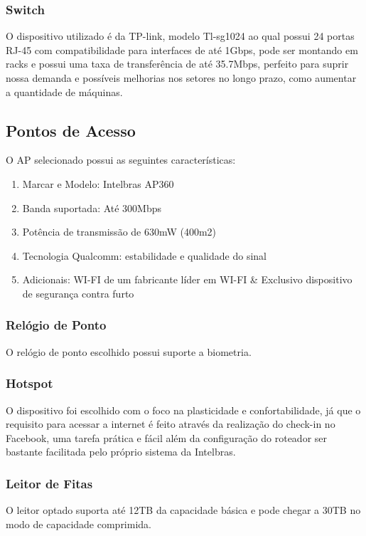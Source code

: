 \documentclass[12pt]{article}
\begin{document}
\subsubsection{Switch}
O dispositivo utilizado é da TP-link, modelo Tl-sg1024 ao qual possui 24 portas RJ-45 com compatibilidade para interfaces de até 1Gbps, pode ser montando em racks e possui uma taxa de transferência de até 35.7Mbps, perfeito para suprir nossa demanda e possíveis melhorias nos setores no longo prazo, como aumentar a quantidade de máquinas.

\subsection{Pontos de Acesso}
O AP selecionado possui as seguintes características:

\begin{enumerate}
    \item Marcar e Modelo: Intelbras AP360
    \item Banda suportada: Até 300Mbps
    \item Potência de transmissão de 630mW (400m2)
    \item Tecnologia Qualcomm: estabilidade e qualidade do sinal
    \item Adicionais: WI-FI de um fabricante líder em WI-FI \& Exclusivo dispositivo de segurança contra furto
\end{enumerate}

\subsubsection{Relógio de Ponto}
O relógio de ponto escolhido possui suporte a biometria.

\subsubsection{Hotspot}
O dispositivo foi escolhido com o foco na plasticidade e confortabilidade, já que o requisito para acessar a internet é feito através da realização do check-in no Facebook, uma tarefa prática e fácil além da configuração do roteador ser bastante facilitada pelo próprio sistema da Intelbras.

\subsubsection{Leitor de Fitas}
O leitor optado suporta até 12TB da capacidade básica e pode chegar a 30TB no modo de capacidade comprimida.
\end{document}
